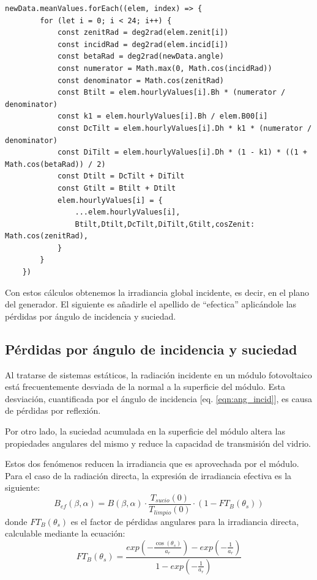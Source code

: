 \begin{lstlisting}[style=ES6, caption={Cálculo del ángulo de incidencia}]
newData.meanValues.forEach((elem, index) => {
		for (let i = 0; i < 24; i++) {
			const zenitRad = deg2rad(elem.zenit[i])
			const incidRad = deg2rad(elem.incid[i])
			const betaRad = deg2rad(newData.angle)
			const numerator = Math.max(0, Math.cos(incidRad))
			const denominator = Math.cos(zenitRad)
			const Btilt = elem.hourlyValues[i].Bh * (numerator / denominator)
			const k1 = elem.hourlyValues[i].Bh / elem.B00[i]
			const DcTilt = elem.hourlyValues[i].Dh * k1 * (numerator / denominator)
			const DiTilt = elem.hourlyValues[i].Dh * (1 - k1) * ((1 + Math.cos(betaRad)) / 2)
			const Dtilt = DcTilt + DiTilt
			const Gtilt = Btilt + Dtilt
			elem.hourlyValues[i] = {
				...elem.hourlyValues[i],
				Btilt,Dtilt,DcTilt,DiTilt,Gtilt,cosZenit: Math.cos(zenitRad),
			}
		}
	})
\end{lstlisting}

Con estos cálculos obtenemos la irradiancia global incidente, es decir, en el plano del generador. El siguiente es añadirle el apellido de ``efectica'' aplicándole las pérdidas por ángulo de incidencia y suciedad.

\subsection{Pérdidas por ángulo de incidencia y suciedad}
\label{section:3.5.3}

Al tratarse de sistemas estáticos, la radiación incidente en un módulo fotovoltaico está frecuentemente desviada de la normal a la superficie del módulo. Esta desviación, cuantificada por el ángulo de incidencia [eq. \ref{eqn:ang_incid}], es causa de pérdidas por reflexión.

Por otro lado, la suciedad acumulada en la superficie del módulo altera las propiedades angulares del mismo y reduce la capacidad de transmisión del vidrio.

Estos dos fenómenos reducen la irradiancia que es aprovechada por el módulo. Para el caso de la radiación directa, la expresión de irradiancia efectiva es la siguiente:
\begin{equation}
B_{ef}(\beta, \alpha)= B(\beta,\alpha)\cdot\frac{T_{sucio}(0)}{T_{limpio}(0)}\cdot(1-FT_B(\theta_s))
\end{equation}
donde $FT_B(\theta_s)$ es el factor de pérdidas angulares para la irradiancia directa, calculable mediante la ecuación:
\begin{equation}
FT_B(\theta_s) = \frac{exp(-\frac{\cos(\theta_s)}{a_r})-exp(-\frac{1}{a_r})}{1-exp(-\frac{1}{a_r})}
\end{equation}

